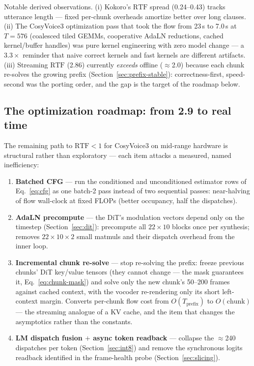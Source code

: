 \documentclass[11pt,a4paper]{article}
\newcommand{\RTF}{\ensuremath{\mathrm{RTF}}}
\begin{document}
Notable derived observations. (i) Kokoro's $\RTF$ spread (0.24--0.43) tracks utterance
length --- fixed per-chunk overheads amortize better over long clauses. (ii) The
CosyVoice3 optimization pass that took the flow from 23\,s to 7.0\,s at $T = 576$
(coalesced tiled GEMMs, cooperative AdaLN reductions, cached kernel/buffer handles) was
pure kernel engineering with zero model change --- a $3.3\times$ reminder that naive
correct kernels and fast kernels are different artifacts. (iii) Streaming $\RTF$
(2.86) currently \emph{exceeds} offline ($\approx$2.0) because each chunk re-solves the
growing prefix (Section~\ref{sec:prefix-stable}): correctness-first, speed-second was
the porting order, and the gap is the target of the roadmap below.

\subsection{The optimization roadmap: from 2.9 to real time}
\label{sec:roadmap}

The remaining path to $\RTF < 1$ for CosyVoice3 on mid-range hardware is structural
rather than exploratory --- each item attacks a measured, named inefficiency:

\begin{enumerate}[leftmargin=2em]
\item \textbf{Batched CFG} --- run the conditioned and unconditioned estimator rows of
Eq.~\eqref{eq:cfg} as one batch-2 pass instead of two sequential passes: near-halving
of flow wall-clock at fixed FLOPs (better occupancy, half the dispatches).
\item \textbf{AdaLN precompute} --- the DiT's modulation vectors depend only on the
timestep (Section~\ref{sec:dit}): precompute all $22 \times 10$ blocks once per
synthesis; removes $22 \times 10 \times 2$ small matmuls and their dispatch overhead
from the inner loop.
\item \textbf{Incremental chunk re-solve} --- stop re-solving the prefix: freeze
previous chunks' DiT key/value tensors (they cannot change --- the mask guarantees it,
Eq.~\ref{eq:chunk-mask}) and solve only the new chunk's 50--200 frames against cached
context, with the vocoder re-rendering only its short left-context margin. Converts
per-chunk flow cost from $O(T_{\mathrm{prefix}})$ to $O(\mathrm{chunk})$ --- the
streaming analogue of a KV cache, and the item that changes the asymptotics rather
than the constants.
\item \textbf{LM dispatch fusion $+$ async token readback} --- collapse the
$\approx$240 dispatches per token (Section~\ref{sec:int8}) and remove the synchronous
logits readback identified in the frame-health probe (Section~\ref{sec:slicing}).
\end{enumerate}
\end{document}
